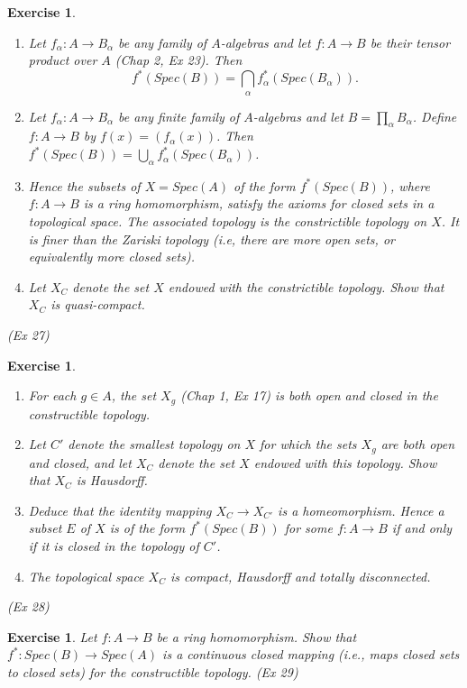 \documentclass[]{report}
\newtheorem{exercise}[theorem]{Exercise}
\begin{document}
\begin{exercise}
    \begin{enumerate}
        \item Let $f_\alpha: A\rightarrow B_\alpha$ be any family of $A$-algebras and let $f:A\rightarrow B$ be their tensor product over $A$ (Chap 2, Ex 23). Then
            $$f^*(Spec(B)) = \bigcap_\alpha f^*_\alpha(Spec(B_\alpha)).$$
        \item Let $f_\alpha: A\rightarrow B_\alpha$ be any finite family of $A$-algebras and let $B = \prod_\alpha B_\alpha$. Define $f:A\rightarrow B$ by $f(x) = (f_\alpha(x))$. Then $f^*(Spec(B)) = \bigcup_\alpha f^*_\alpha(Spec(B_\alpha))$. 
        \item Hence the subsets of $X = Spec(A)$ of the form $f^*(Spec(B))$, where $f:A\rightarrow B$ is a ring homomorphism, satisfy the axioms for closed sets in a topological space. The associated topology is the constrictible topology on $X$. It is finer than the Zariski topology (i.e, there are more open sets, or equivalently more closed sets).
        \item Let $X_C$ denote the set $X$ endowed with the constrictible topology. Show that $X_C$ is quasi-compact.
    \end{enumerate}
    (Ex 27)
\end{exercise}

\begin{exercise}
    \begin{enumerate}
        \item For each $g\in A$, the set $X_g$ (Chap 1, Ex 17) is both open and closed in the constructible topology.
        \item Let $C'$ denote the smallest topology on $X$ for which the sets $X_g$ are both open and closed, and let $X_C$ denote the set $X$ endowed with this topology. Show that $X_C$ is Hausdorff.
        \item Deduce that the identity mapping $X_C\rightarrow X_{C'}$ is a homeomorphism. Hence a subset $E$ of $X$ is of the form $f^*(Spec(B))$ for some $f:A\rightarrow B$ if and only if it is closed in the topology of $C'$. 
        \item The topological space $X_C$ is compact, Hausdorff and totally disconnected. 
    \end{enumerate}
    (Ex 28)
\end{exercise}

\begin{exercise}
    Let $f:A\rightarrow B$ be a ring homomorphism. Show that $f^*: Spec(B)\rightarrow Spec(A)$ is a continuous closed mapping (i.e., maps closed sets to closed sets) for the constructible topology.
    (Ex 29)
\end{exercise}
\end{document}
